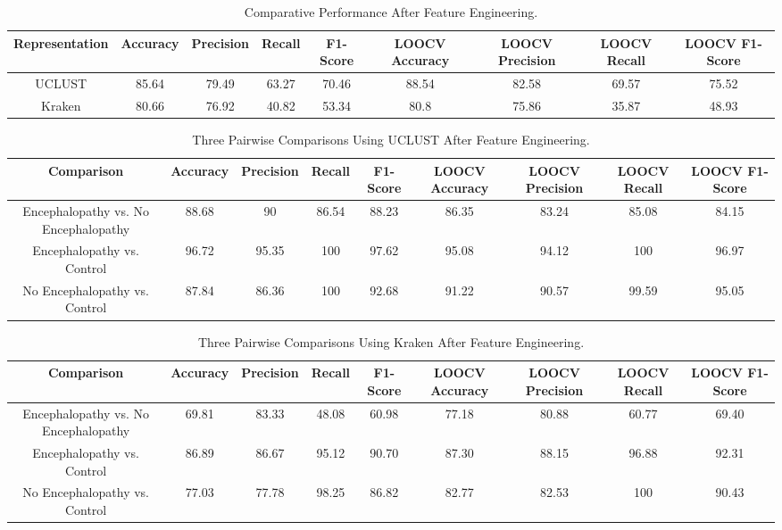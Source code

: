 \begin{table}[t]
\begin{center}
\caption{Comparative Performance After Feature Engineering. \label{tab:pfe}}
\begin{tabular}{|c|cccc|cccc|}\hline
Representation & Accuracy & Precision & Recall & F1-Score & LOOCV Accuracy & LOOCV Precision & LOOCV Recall & LOOCV F1-Score\\\hline
UCLUST & 85.64 & 79.49 & 63.27 & 70.46 & 88.54 & 82.58 & 69.57 & 75.52\\\hline
Kraken & 80.66 & 76.92 & 40.82 & 53.34 & 80.8 & 75.86 & 35.87 & 48.93\\\hline
\end{tabular}
\end{center}
\end{table}


\begin{table}[t]
\begin{center}
\caption{Three Pairwise Comparisons Using UCLUST After Feature Engineering. \label{tab:pairuclustfe}}
\begin{tabular}{|c|cccc|cccc|}\hline
Comparison & Accuracy & Precision & Recall & F1-Score & LOOCV Accuracy & LOOCV Precision & LOOCV Recall & LOOCV F1-Score\\\hline
Encephalopathy vs. No Encephalopathy & 88.68 & 90 & 86.54 & 88.23 & 86.35 & 83.24 & 85.08 & 84.15\\\hline
Encephalopathy vs. Control & 96.72 & 95.35 & 100 & 97.62 & 95.08 & 94.12 & 100 & 96.97\\\hline
No Encephalopathy vs. Control & 87.84 & 86.36 & 100 & 92.68 & 91.22 & 90.57 & 99.59 & 95.05\\\hline
\end{tabular}
\end{center}
\end{table}


\begin{table}[t]
\begin{center}
\caption{Three Pairwise Comparisons Using Kraken After Feature Engineering. \label{tab:pairkrakenfe}}
\begin{tabular}{|c|cccc|cccc|}\hline
Comparison & Accuracy & Precision & Recall & F1-Score & LOOCV Accuracy & LOOCV Precision & LOOCV Recall & LOOCV F1-Score\\\hline
Encephalopathy vs. No Encephalopathy & 69.81 & 83.33 & 48.08 & 60.98 & 77.18 & 80.88 & 60.77 & 69.40\\\hline
Encephalopathy vs. Control & 86.89 & 86.67 & 95.12 & 90.70 & 87.30 & 88.15 & 96.88 & 92.31\\\hline
No Encephalopathy vs. Control & 77.03 & 77.78 & 98.25 & 86.82 & 82.77 & 82.53 & 100 & 90.43\\\hline
\end{tabular}
\end{center}
\end{table}


